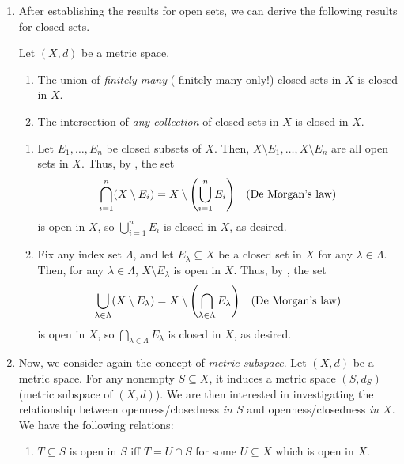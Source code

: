 \begin{enumerate}
\item After establishing the results for open sets, we can derive the following
results for closed sets.
\begin{corollary}
Let \((X,d)\) be a metric space.
\begin{enumerate}
\item \label{it:closed-sets-union-closed}
The union of \emph{finitely many} (\warn{} finitely many only!) closed
sets in \(X\) is closed in \(X\).
\item \label{it:closed-sets-intersect-closed}
The intersection of \emph{any collection} of closed sets in \(X\) is
closed in \(X\).
\end{enumerate}
\end{corollary}
\begin{pf}
\begin{enumerate}
\item Let \(E_1,\dotsc,E_n\) be closed subsets of \(X\).
Then, \(X\setminus E_1,\dotsc,X\setminus E_n\) are all open sets in \(X\).
Thus, by , the set
\[
\bigcap_{i=1}^{n}(X\setminus E_i)=X\setminus\qty(\bigcup_{i=1}^{n}E_i)\quad\text{(De Morgan's law)}
\]
is open in \(X\), so \(\displaystyle \bigcup_{i=1}^{n}E_i\) is closed in \(X\),
as desired.

\item Fix any index set \(\Lambda\), and let \(E_\lambda\subseteq X\) be a
closed set in \(X\) for any \(\lambda\in\Lambda\). Then, for any
\(\lambda\in\Lambda\),  \(X\setminus E_{\lambda}\) is open in \(X\).
Thus, by , the set
\[
\bigcup_{\lambda\in\Lambda}(X\setminus E_{\lambda})=X\setminus\qty(\bigcap_{\lambda\in\Lambda}E_{\lambda})\quad\text{(De Morgan's law)}
\]
is open in \(X\), so \(\displaystyle \bigcap_{\lambda\in\Lambda}E_{\lambda}\) is closed in \(X\),
as desired.
\end{enumerate}
\end{pf}
\item \label{it:open-closed-equiv-crit-metric-subspace} Now, we consider again the concept of \emph{metric subspace}. Let
\((X,d)\) be a metric space. For any nonempty \(S\subseteq X\), it induces a
metric space \((S,d_S)\) (metric subspace of \((X,d)\)). We are then interested
in investigating the relationship between openness/closedness \emph{in \(S\)}
and openness/closedness \emph{in \(X\)}. We have the following relations:
\begin{enumerate}
\item \(T\subseteq S\) is open in \(S\) iff \(T=U\cap S\) for some \(U\subseteq
X\) which is open in \(X\).


\end{enumerate}
\end{enumerate}
